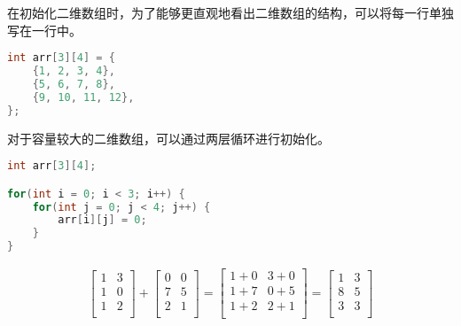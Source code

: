 在初始化二维数组时，为了能够更直观地看出二维数组的结构，可以将每一行单独写在一行中。

\vspace{-0.5cm}

\begin{lstlisting}[language=C++]
int arr[3][4] = {
	{1, 2, 3, 4},
	{5, 6, 7, 8},
	{9, 10, 11, 12},
};
\end{lstlisting}

对于容量较大的二维数组，可以通过两层循环进行初始化。

\vspace{-0.5cm}

\begin{lstlisting}[language=C++]
int arr[3][4];

for(int i = 0; i < 3; i++) {
	for(int j = 0; j < 4; j++) {
		arr[i][j] = 0;
	}
}
\end{lstlisting}

\vspace{0.5cm}


\begin{align}\nonumber
	\left[\begin{matrix}
			1 & 3 \\
			1 & 0 \\
			1 & 2 \\
		\end{matrix} \right]
	+
	\left[\begin{matrix}
			0 & 0 \\
			7 & 5 \\
			2 & 1 \\
		\end{matrix} \right]
	=
	\left[\begin{matrix}
			1+0 & 3+0 \\
			1+7 & 0+5 \\
			1+2 & 2+1 \\
		\end{matrix} \right]
	=
	\left[\begin{matrix}
			1 & 3 \\
			8 & 5 \\
			3 & 3 \\
		\end{matrix} \right]
\end{align}

